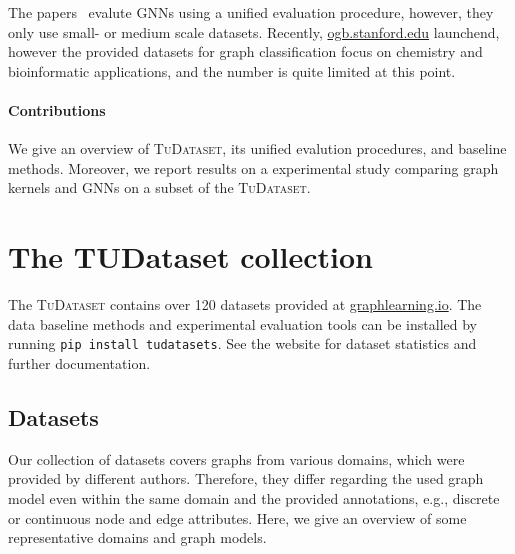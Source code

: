 \documentclass{article}
\theoremstyle{definition}
\begin{document}
The papers~\cite{Fey+2019,Err+2019,Dwi+2020} evalute GNNs using a unified evaluation procedure, however, they only use small- or medium scale datasets. Recently, \url{ogb.stanford.edu} launchend, however the provided datasets for graph classification focus on chemistry and bioinformatic applications, and the number is quite limited at this point.

\paragraph{Contributions} We give an overview of \textsc{TuDataset}, its unified evalution procedures, and baseline methods. Moreover, we report results on a experimental study comparing graph kernels and GNNs on a subset of the \textsc{TuDataset}.

\section{The TUDataset collection}

The \textsc{TuDataset} contains over 120 datasets provided at \url{graphlearning.io}. The data  baseline methods and experimental evaluation tools can be installed by running \texttt{pip install tudatasets}. See the website for dataset statistics and further documentation.

\subsection{Datasets}

Our collection of datasets covers graphs from various domains, which were provided by different authors. Therefore, they differ regarding the used graph model even within the same domain and the provided annotations, e.g., discrete or continuous node and edge attributes. Here, we give an overview of some representative domains and graph models.
\end{document}
